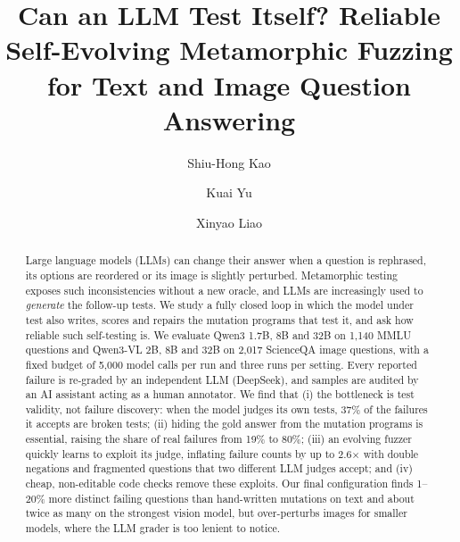 \documentclass[sigconf]{acmart}
\begin{document}
\title{Can an LLM Test Itself? Reliable Self-Evolving Metamorphic Fuzzing for Text and Image Question Answering}

\author{Shiu-Hong Kao}

\author{Kuai Yu}

\author{Xinyao Liao}

\begin{abstract}
\noindent
Large language models (LLMs) can change their answer when a question is rephrased, its options are reordered or its
image is slightly perturbed. Metamorphic testing exposes such inconsistencies without a new oracle, and LLMs are
increasingly used to \emph{generate} the follow-up tests. We study a fully closed loop in which the model under test
also writes, scores and repairs the mutation programs that test it, and ask how reliable such self-testing is. We
evaluate Qwen3 1.7B, 8B and 32B on 1{,}140 MMLU questions and Qwen3-VL 2B, 8B and 32B on 2{,}017 ScienceQA image
questions, with a fixed budget of 5{,}000 model calls per run and three runs per setting. Every reported failure is
re-graded by an independent LLM (DeepSeek), and samples are audited by an AI assistant acting as a human annotator.
We find that (i) the bottleneck is test validity, not failure discovery: when the model judges its own tests, 37\% of
the failures it accepts are broken tests; (ii) hiding the gold answer from the mutation programs is essential, raising
the share of real failures from 19\% to 80\%; (iii) an evolving fuzzer quickly learns to exploit its judge, inflating
failure counts by up to 2.6$\times$ with double negations and fragmented questions that two different LLM judges accept;
and (iv) cheap, non-editable code checks remove these exploits. Our final configuration finds 1--20\% more distinct
failing questions than hand-written mutations on text and about twice as many on the strongest vision model, but
over-perturbs images for smaller models, where the LLM grader is too lenient to notice.
\end{abstract}
\end{document}
